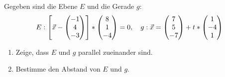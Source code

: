 Gegeben sind die Ebene $E$ und die Gerade $g$:
\begin{equation*}
	E: \left[ \vec x -  \begin{pmatrix} -1 \\ 4\\ -3 \end{pmatrix}\right]*\begin{pmatrix} 8\\ 1 \\-4 \end{pmatrix}=0,\quad
	g: \vec x=\begin{pmatrix} 7\\5\\-7 \end{pmatrix}+t*\begin{pmatrix} 1\\-4\\1 \end{pmatrix}
\end{equation*}
\begin{enumerate}
	\item Zeige, dass $E$ und $g$ parallel zueinander sind.
	\item Bestimme den Abstand von $E$ und $g$.
\end{enumerate}
